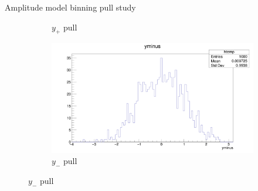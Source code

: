 \documentclass{beamer}
\begin{document}
\begin{frame}{Amplitude model binning pull study}
\begin{figure}
\begin{subfigure}{0.5\textwidth}
      \caption{$y_+$ pull}
    \end{subfigure}%
    \begin{subfigure}{0.5\textwidth}
      \includegraphics[width = 1.0\textwidth]{AmplitudePulls/yminus1K1K.png}
      \caption{$y_-$ pull}
    \end{subfigure}
  \end{figure}
\end{frame}
\end{document}

